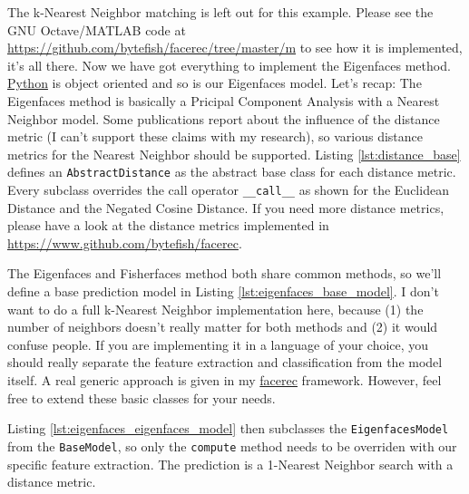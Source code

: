 \ifx\python\undefined
	The k-Nearest Neighbor matching is left out for this example. Please see the GNU Octave/MATLAB code at \url{https://github.com/bytefish/facerec/tree/master/m} to see how it is implemented, it's all there.
\else
	Now we have got everything to implement the Eigenfaces method. \href{http://www.python.org}{Python} is object oriented and so is our Eigenfaces model. Let's recap: The Eigenfaces method is basically a Pricipal Component Analysis with a Nearest Neighbor model. Some publications report about the influence of the distance metric (I can't support these claims with my research), so various distance metrics for the Nearest Neighbor should be supported. Listing \ref{lst:distance_base} defines an \lstinline|AbstractDistance| as the abstract base class for each distance metric. Every subclass overrides the call operator \lstinline|__call__| as shown for the Euclidean Distance and the Negated Cosine Distance. If you need more distance metrics, please have a look at the distance metrics implemented in \url{https://www.github.com/bytefish/facerec}.
	
	
	
	The Eigenfaces and Fisherfaces method both share common methods, so we'll define a base prediction model in Listing \ref{lst:eigenfaces_base_model}. I don't want to do a full k-Nearest Neighbor implementation here, because (1) the number of neighbors doesn't really matter for both methods and (2) it would confuse people. If you are implementing it in a language of your choice, you should really separate the feature extraction and classification from the model itself. A real generic approach is given in my \href{https://www.github.com/bytefish/facerec}{facerec} framework. However, feel free to extend these basic classes for your needs.
	
	

	Listing \ref{lst:eigenfaces_eigenfaces_model} then subclasses the \lstinline|EigenfacesModel| from the \lstinline|BaseModel|, so only the \lstinline|compute| method needs to be overriden with our specific feature extraction. The prediction is a 1-Nearest Neighbor search with a distance metric. 
	
	
	
